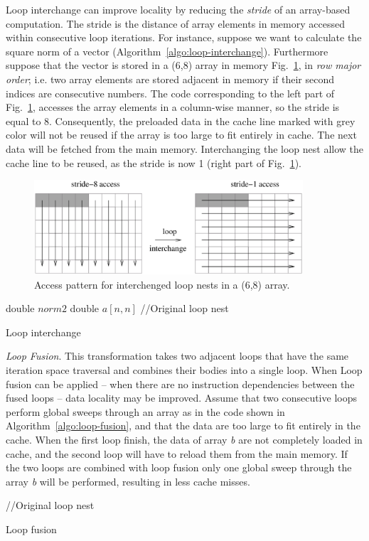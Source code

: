 Loop interchange can improve locality by reducing the \textit{stride} of an array-based computation. The stride is the distance of array elements in memory accessed within consecutive loop iterations. For instance, suppose we want to calculate the square norm of a vector (Algorithm~\ref{algo:loop-interchange}). Furthermore suppose that the vector is stored in a (6,8) array in memory Fig.~\ref{fig:interchanged-loop-nests}, in \textit{row major order}; i.e. two array elements are stored adjacent in memory if their second indices are consecutive numbers. The code corresponding to the left part of Fig.~\ref{fig:interchanged-loop-nests}, accesses the array elements in a column-wise manner, so the stride is equal to 8. Consequently, the preloaded data in the cache line marked with grey color will not be reused if the array is too large to fit entirely in cache. The next data will be fetched from the main memory. Interchanging the loop nest allow the cache line to be reused, as the stride is now 1 (right part of Fig.~\ref{fig:interchanged-loop-nests}). \\
\begin{figure}
   \centering
   \includegraphics[width=10cm]{Figs/Interchanged_loop_nests.eps}
   \caption{Access pattern for interchenged loop nests in a (6,8) array.} \label{fig:interchanged-loop-nests}
\end{figure} 


\begin{algorithm}[t]
\SetAlgoLined
double $norm2$\;
double $a[n,n]$\;
//Original loop nest\;
\caption{Loop interchange} \label{algo:loop-interchange}
\end{algorithm}


\noindent \textit{Loop Fusion}. This transformation takes two adjacent loops that have the same iteration space traversal and combines their bodies into a single loop.%
When Loop fusion can be applied -- when there are no instruction dependencies between the fused loops -- data locality may be improved. Assume that two consecutive loops perform global sweeps through an array as in the code shown in Algorithm~\ref{algo:loop-fusion},
and that the data are too large to fit entirely in the cache. When the first loop finish, the data of array \textit{b} are not completely loaded in cache, and the second loop will have to reload them from the main memory. If the two loops are combined with loop fusion only one global sweep through the array \textit{b} will be performed, resulting in less cache misses. \\
\begin{algorithm}[h]
//Original loop nest\;
\SetAlgoLined
{}
\caption{Loop fusion} \label{algo:loop-fusion}
\end{algorithm}

